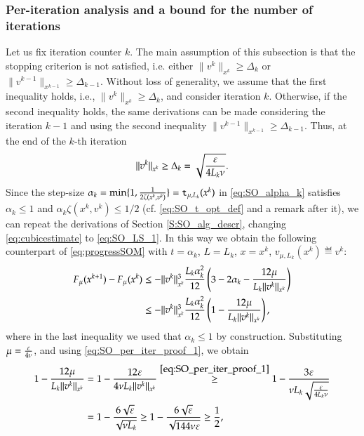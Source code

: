\subsubsection{Per-iteration analysis and a bound for the number of iterations}
Let us fix iteration counter $k$. The main assumption of this subsection is that the stopping criterion is not satisfied, i.e. either
$\|v^{k}\|_{x^{k}} \geq \Delta_{k}$ or $\|v^{k-1}\|_{x^{k-1}} \geq \Delta_{k-1}$. 
Without loss of generality, we assume that the first inequality holds, i.e., $\|v^{k}\|_{x^{k}} \geq \Delta_{k}$, and consider iteration $k$. Otherwise, if the second inequality holds, the same derivations can be made considering the iteration $k-1$ and using the second inequality $\|v^{k-1}\|_{x^{k-1}} \geq \Delta_{k-1}$. Thus, at the end of the $k$-th iteration 
\begin{equation}
\label{eq:SO_per_iter_proof_1}
\|v^{k}\|_{x^{k}} \geq \Delta_{k}=\sqrt{\frac{\varepsilon}{4L_{k}\nu}}.
\end{equation}
Since the step-size $\alpha_k= \min\{1,\frac{1}{ 2\zeta(x^k,v^k)}\} = \mathtt{t}_{\mu,L_k}(x^{k})$ in \eqref{eq:SO_alpha_k} satisfies $\alpha_k \leq 1$ and $\alpha_k \zeta(x^k,v^k) \leq 1/2$ (cf. \eqref{eq:SO_t_opt_def} and a remark after it), we can repeat the derivations of Section \ref{S:SO_alg_descr}, 
changing  \eqref{eq:cubicestimate} to  \eqref{eq:SO_LS_1}.
In this way we obtain the following counterpart of \eqref{eq:progressSOM} with $t=\alpha_k$, $L=L_k$, $x=x^k$, $v_{\mu,L_k}(x^{k}) \eqdef v^k$: 
\begin{align}
F_{\mu}(x^{k+1})-F_{\mu}(x^{k})&\leq - \lVert v^{k}\rVert^{3}_{x^{k}} \frac{L_k\alpha_k^2}{12}\left(3 - 2\alpha_k - \frac{12 \mu}{L_k\lVert v^{k}\rVert_{x^{k}}} \right)\nonumber\\
& \leq - \lVert v^{k}\rVert^{3}_{x^{k}} \frac{L_k\alpha_k^2}{12}\left(1 - \frac{12 \mu}{L_k\lVert v^{k}\rVert_{x^{k}}} \right)\label{eq:SO_per_iter_proof_2},
\end{align}
where in the last inequality we used that $\alpha_k \leq 1$ by construction. 
Substituting $\mu = \frac{\varepsilon}{4\nu}$, and using \eqref{eq:SO_per_iter_proof_1}, we obtain
\begin{align*}
1 - \frac{12 \mu}{L_k\norm{v^{k}}_{x^{k}}} &= 1 - \frac{12 \eps}{4\nu L_k\norm{v^{k}}_{x^{k}}}  %
\stackrel{\eqref{eq:SO_per_iter_proof_1}}{\geq} 1 - \frac{3 \eps}{\nu L_k\sqrt{\frac{\eps}{4L_{k}\nu}}} \\
&= 1 - \frac{6 \sqrt{\eps}}{ \sqrt{\nu L_k}} \geq 1 - \frac{6 \sqrt{\eps}}{ \sqrt{ 144 \nu \eps	}}  \geq \frac{1}{2},
\end{align*}
